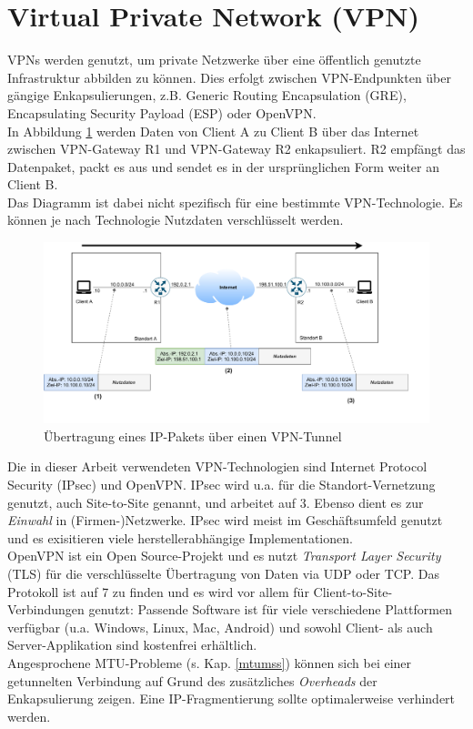 \section{Virtual Private Network (VPN)}\label{vpn}
\gls{VPN}s werden genutzt, um private Netzwerke über eine öffentlich genutzte Infrastruktur abbilden zu können. Dies erfolgt zwischen \gls{VPN}-Endpunkten über gängige Enkapsulierungen, z.B. Generic Routing Encapsulation (GRE), Encapsulating Security Payload (ESP) oder OpenVPN.\\
In Abbildung \ref{grafik: vpn-example} werden Daten von \gls{Client} A zu \gls{Client} B über das Internet zwischen \gls{VPN-Gateway} R1 und \gls{VPN-Gateway} R2 enkapsuliert. R2 empfängt das Datenpaket, packt es aus und sendet es in der ursprünglichen Form weiter an \gls{Client} B.\\
Das Diagramm ist dabei nicht spezifisch für eine bestimmte \gls{VPN}-Technologie. Es können je nach Technologie Nutzdaten verschlüsselt werden. 
\begin{figure}[h]
  \centering
  \includegraphics[scale=0.65]{Figures/vpn-example.pdf}
  \caption{Übertragung eines IP-Pakets über einen VPN-Tunnel}
  \label{grafik: vpn-example}
\end{figure}\FloatBarrier

Die in dieser Arbeit verwendeten \gls{VPN}-Technologien sind Internet Protocol Security (\gls{IPsec}) und OpenVPN. \gls{IPsec} wird u.a. für die Standort-Vernetzung genutzt, auch \gls{Site-to-Site} genannt, und arbeitet auf  3. Ebenso dient es zur \textit{Einwahl} in (Firmen-)Netzwerke. \gls{IPsec} wird meist im Geschäftsumfeld genutzt und es exisitieren viele herstellerabhängige Implementationen.\\
OpenVPN ist ein Open Source-Projekt und es nutzt \textit{Transport Layer Security} (TLS) für die verschlüsselte Übertragung von Daten via \gls{UDP} oder \gls{TCP}. Das Protokoll ist auf  7 zu finden und es wird vor allem für \gls{Client-to-Site}-Verbindungen genutzt: Passende Software ist für viele verschiedene Plattformen verfügbar (u.a. Windows, Linux, Mac, Android) und sowohl \gls{Client}- als auch Server-Applikation sind kostenfrei erhältlich.\\
Angesprochene \gls{MTU}-Probleme (s. Kap. \ref{mtumss}) können sich bei einer getunnelten Verbindung auf Grund des zusätzliches \textit{Overheads} der Enkapsulierung zeigen. Eine IP-Fragmentierung sollte optimalerweise verhindert werden.

